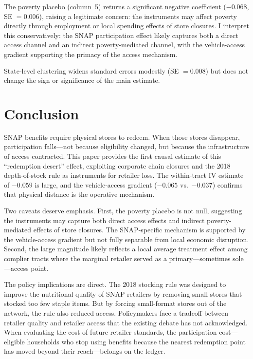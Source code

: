 \documentclass[12pt]{article}
\begin{document}
The poverty placebo (column~5) returns a significant negative coefficient ($-0.068$, SE $= 0.006$), raising a legitimate concern: the instruments may affect poverty directly through employment or local spending effects of store closures. I interpret this conservatively: the SNAP participation effect likely captures both a direct access channel and an indirect poverty-mediated channel, with the vehicle-access gradient supporting the primacy of the access mechanism.

State-level clustering widens standard errors modestly (SE $= 0.008$) but does not change the sign or significance of the main estimate.


\section{Conclusion}
\label{sec:conclusion}

SNAP benefits require physical stores to redeem. When those stores disappear, participation falls---not because eligibility changed, but because the infrastructure of access contracted. This paper provides the first causal estimate of this ``redemption desert'' effect, exploiting corporate chain closures and the 2018 depth-of-stock rule as instruments for retailer loss. The within-tract IV estimate of $-0.059$ is large, and the vehicle-access gradient ($-0.065$ vs.\ $-0.037$) confirms that physical distance is the operative mechanism.

Two caveats deserve emphasis. First, the poverty placebo is not null, suggesting the instruments may capture both direct access effects and indirect poverty-mediated effects of store closures. The SNAP-specific mechanism is supported by the vehicle-access gradient but not fully separable from local economic disruption. Second, the large magnitude likely reflects a local average treatment effect among complier tracts where the marginal retailer served as a primary---sometimes sole---access point.

The policy implications are direct. The 2018 stocking rule was designed to improve the nutritional quality of SNAP retailers by removing small stores that stocked too few staple items. But by forcing small-format stores out of the network, the rule also reduced access. Policymakers face a tradeoff between retailer quality and retailer access that the existing debate has not acknowledged. When evaluating the cost of future retailer standards, the participation cost---eligible households who stop using benefits because the nearest redemption point has moved beyond their reach---belongs on the ledger.
\end{document}
